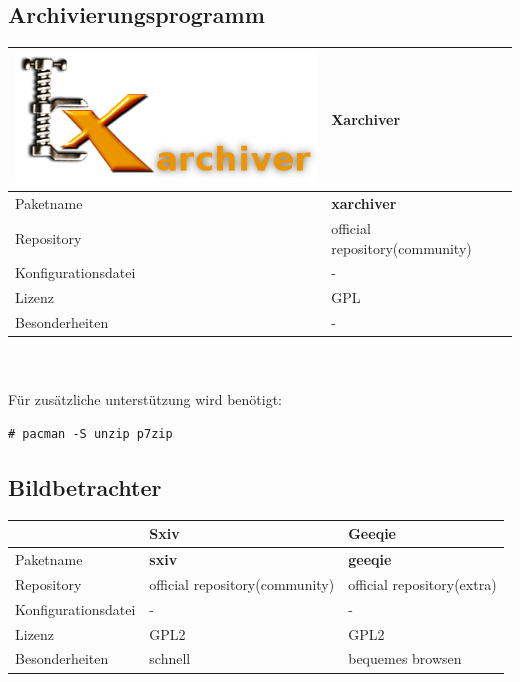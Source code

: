 \subsection{Archivierungsprogramm}
\begin{tabular}{l|l}
\includegraphics[scale=0.25]{xarchiver-logo.png} & Xarchiver \\ \hline
Paketname & \textbf{xarchiver} \\ 
Repository & official repository(community) \\
Konfigurationsdatei & - \\
Lizenz & GPL \\
Besonderheiten & - \\
\end{tabular}
\\ \\
Für zusätzliche unterstützung wird benötigt:
\begin{lstlisting}[style=Bash]
# pacman -S unzip p7zip 
\end{lstlisting}

\subsection{Bildbetrachter}
\begin{tabular}{l|l|l}
~ & Sxiv & Geeqie \\ \hline
Paketname & \textbf{sxiv} & \textbf{geeqie} \\ 
Repository & official repository(community) & official repository(extra) \\
Konfigurationsdatei & - & - \\
Lizenz & GPL2 & GPL2 \\
Besonderheiten & schnell & bequemes browsen \\
\end{tabular}


